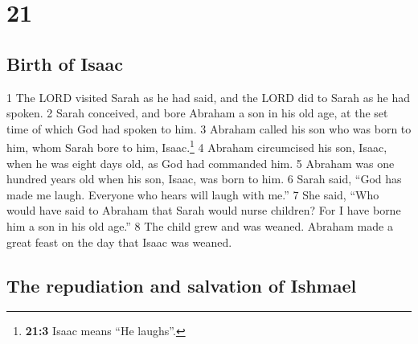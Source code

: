 \hypertarget{section-20}{%
\section{21}\label{section-20}}

\hypertarget{birth-of-isaac}{%
\subsection{Birth of Isaac}\label{birth-of-isaac}}

{1} The LORD visited Sarah as he had said, and the LORD did to Sarah as
he had spoken. {2} Sarah conceived, and bore Abraham a son in his old
age, at the set time of which God had spoken to him. {3} Abraham called
his son who was born to him, whom Sarah bore to him, Isaac.\footnote{\textbf{21:3}
  Isaac means ``He laughs''.} {4} Abraham circumcised his son, Isaac,
when he was eight days old, as God had commanded him. {5} Abraham was
one hundred years old when his son, Isaac, was born to him. {6} Sarah
said, ``God has made me laugh. Everyone who hears will laugh with me.''
{7} She said, ``Who would have said to Abraham that Sarah would nurse
children? For I have borne him a son in his old age.'' {8} The child
grew and was weaned. Abraham made a great feast on the day that Isaac
was weaned.

\hypertarget{the-repudiation-and-salvation-of-ishmael}{%
\subsection{The repudiation and salvation of
Ishmael}\label{the-repudiation-and-salvation-of-ishmael}}

